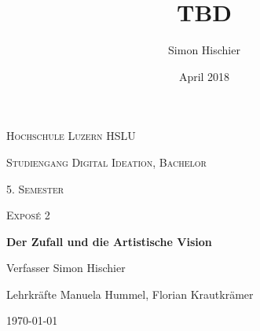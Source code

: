 \documentclass[10pt,a4paper]{article}
\title{TBD}
\author{Simon Hischier}
\date{April 2018}
\begin{document}
\begin{titlepage}
\centering
\vspace{1cm}
	{\scshape\LARGE Hochschule Luzern HSLU \par}
	\vspace{1cm}
	{\scshape\Large Studiengang Digital Ideation, Bachelor \par}
	
	{\scshape\Large 5. Semester\par}
	{\scshape\Large Exposé 2 \par}
	\vspace{1.5cm}
	{\huge\bf Der Zufall und die Artistische Vision\par}
	
	\vspace{10cm}
	{\Large Verfasser Simon Hischier\par}
	{\Large Lehrkräfte Manuela Hummel, Florian Krautkrämer\par}
	\vfill

	{\large \today\par}
\end{titlepage}
\end{document}
